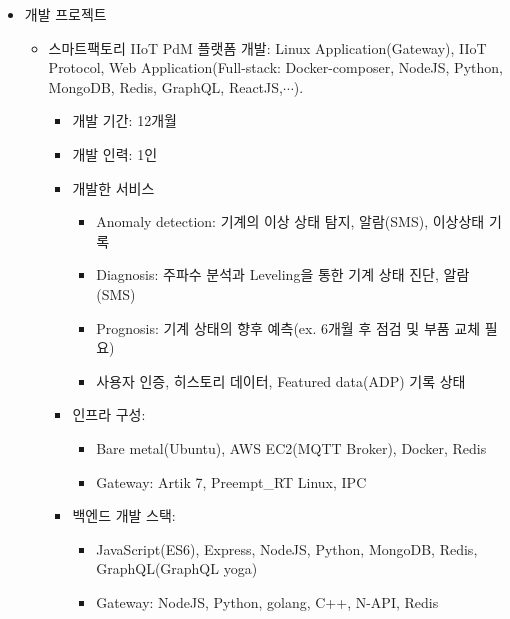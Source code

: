 \divider


\begin{itemize}[label=]
	\item 개발 프로젝트
	      \begin{itemize}[label=]
		      \item 스마트팩토리 IIoT PdM 플랫폼 개발: Linux Application(Gateway), IIoT Protocol, Web Application(Full-stack: Docker-composer, NodeJS, Python, MongoDB, Redis, GraphQL, ReactJS,$\cdots$).
		            \begin{itemize}[label=]
			            \item 개발 기간: 12개월
			            \item 개발 인력: 1인
			            \item 개발한 서비스
			                  \begin{itemize}
				                  \item Anomaly detection: 기계의 이상 상태 탐지, 알람(SMS), 이상상태 기록
				                  \item Diagnosis: 주파수 분석과 Leveling을 통한 기계 상태 진단, 알람(SMS)
				                  \item Prognosis: 기계 상태의 향후 예측(ex. 6개월 후 점검 및 부품 교체 필요)
				                  \item 사용자 인증, 히스토리 데이터, Featured data(ADP) 기록 상태
			                  \end{itemize}
			            \item 인프라 구성:
			                  \begin{itemize}
				                  \item Bare metal(Ubuntu), AWS EC2(MQTT Broker), Docker, Redis
				                  \item Gateway: Artik 7, Preempt\_RT Linux, IPC
			                  \end{itemize}
			            \item 백엔드 개발 스택:
			                  \begin{itemize}
				                  \item JavaScript(ES6), Express, NodeJS, Python, MongoDB, Redis, GraphQL(GraphQL yoga)
				                  \item Gateway: NodeJS, Python, golang, C++, N-API, Redis
			                  \end{itemize}

\end{itemize}
\end{itemize}
\end{itemize}

